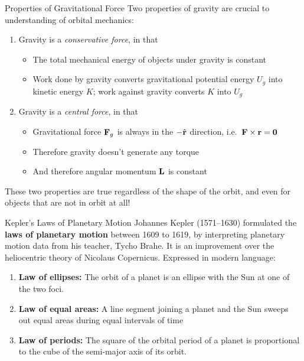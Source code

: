\documentclass[12pt,compress,aspectratio=169]{beamer}
\newcommand{\mb}[1]{\ensuremath\mathbf{#1}}
\begin{document}
\begin{frame}{Properties of Gravitational Force}
  Two properties of gravity are crucial to understanding of orbital mechanics:
  \begin{enumerate}
  \item Gravity is a \emph{conservative force}, in that
    \begin{itemize}
    \item The total mechanical energy of objects under gravity is constant
    \item Work done by gravity converts gravitational potential energy $U_g$
      into kinetic energy $K$; work against gravity converts $K$ into $U_g$
    \end{itemize}
  \item Gravity is a \emph{central force}, in that
    \begin{itemize}
    \item Gravitational force $\mb{F}_g$ is always in the $-\hat{\mb{r}}$
      direction, i.e.\ $\mb{F}\times\mb{r}=\mb{0}$
    \item Therefore gravity doesn't generate any torque
    \item And therefore angular momentum $\mb{L}$ is constant
    \end{itemize}
  \end{enumerate}
  These two properties are true regardless of the shape of the orbit, and even
  for objects that are not in orbit at all!
\end{frame}


\begin{frame}{Kepler's Laws of Planetary Motion}
  Johannes Kepler (1571--1630) formulated the \textbf{laws of planetary motion}
  between 1609 to 1619, by interpreting planetary motion data from his teacher,
  Tycho Brahe. It is an improvement over the heliocentric theory of Nicolaus
  Copernicus. Expressed in modern language:
  \begin{enumerate}
  \item\textbf{Law of ellipses:} The orbit of a planet is an ellipse with the
    Sun at one of the two foci.
  \item\textbf{Law of equal areas:} A line segment joining a planet and the Sun
    sweeps out equal areas during equal intervals of time
  \item \textbf{Law of periods:} The square of the orbital period of a planet
    is proportional to the cube of the semi-major axis of its orbit.
  \end{enumerate}
\end{frame}
\end{document}
